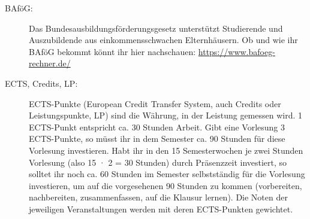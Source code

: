 \begin{description}

\item[BAföG:] Das Bundesausbildungsförderungsgesetz unterstützt Studierende und Auszubildende aus einkommensschwachen Elternhäusern. Ob und wie ihr BAföG bekommt könnt ihr hier nachschauen: \url{https://www.bafoeg-rechner.de/}	%


\item[ECTS, Credits, LP:] ECTS-Punkte (European Credit Transfer System, auch Credits oder
Leistungspunkte, LP) sind die Währung, in der Leistung gemessen wird. 1
ECTS-Punkt entspricht ca. 30 Stunden Arbeit. Gibt eine Vorlesung 3 ECTS-Punkte,
so müsst ihr in dem Semester ca. 90 Stunden für diese Vorlesung investieren. Habt
ihr in den 15 Semesterwochen je zwei Stunden Vorlesung (also 15 · 2 = 30 Stunden) durch Präsenzzeit investiert, so solltet ihr noch ca. 60 Stunden im Semester
selbstständig für die Vorlesung investieren, um auf die vorgesehenen 90 Stunden zu kommen (vorbereiten, nachbereiten, zusammenfassen, auf die Klausur lernen).
Die Noten der jeweiligen Veranstaltungen werden mit deren ECTS-Punkten gewichtet.

\vfill


\pagebreak

\end{description}

